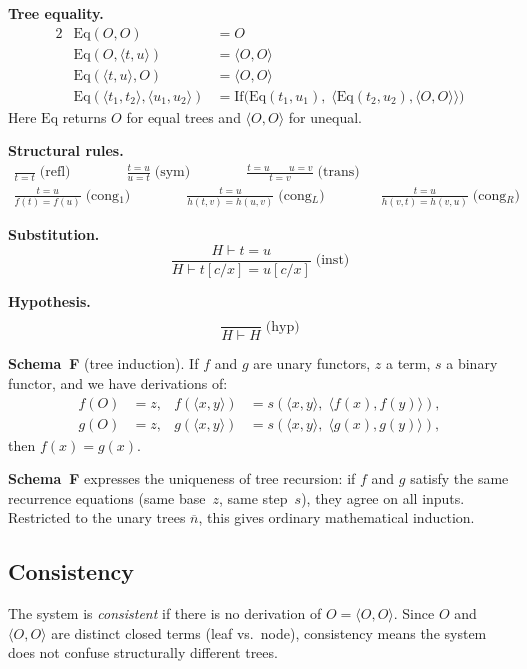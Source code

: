 \documentclass[11pt]{article}
\newcommand{\pair}[2]{\langle #1, #2 \rangle}
\newcommand{\pmark}{\pair{O}{O}}   %
\newcommand{\SchemaF}{\textbf{Schema~F}}
\newcommand{\nat}[1]{\overline{#1}}
\begin{document}
\noindent
\textbf{Tree equality.}
\begin{alignat*}{2}
  &\mathrm{Eq}(O, O) &= O \\
  &\mathrm{Eq}(O, \pair{t}{u}) &= \pmark \\
  &\mathrm{Eq}(\pair{t}{u}, O) &= \pmark \\
  &\mathrm{Eq}(\pair{t_1}{t_2}, \pair{u_1}{u_2})
    &= \mathrm{If}\bigl(\mathrm{Eq}(t_1, u_1),\;
         \pair{\mathrm{Eq}(t_2, u_2)}{\pmark}\bigr)
\end{alignat*}
Here $\mathrm{Eq}$ returns $O$ for equal trees and $\pmark$ for unequal.

\medskip\noindent
\textbf{Structural rules.}
\begin{gather*}
  \frac{\phantom{t=t}}{t = t}\;\text{(refl)}
  \qquad\qquad
  \frac{t = u}{u = t}\;\text{(sym)}
  \qquad\qquad
  \frac{t = u \qquad u = v}{t = v}\;\text{(trans)}
  \\[8pt]
  \frac{t = u}{f(t) = f(u)}\;\text{(cong$_1$)}
  \qquad\qquad
  \frac{t = u}{h(t, v) = h(u, v)}\;\text{(cong$_L$)}
  \qquad\qquad
  \frac{t = u}{h(v, t) = h(v, u)}\;\text{(cong$_R$)}
\end{gather*}

\noindent
\textbf{Substitution.}
\[
  \frac{H \vdash t = u}
       {H \vdash t[c/x] = u[c/x]}
  \;\text{(inst)}
\]

\noindent
\textbf{Hypothesis.}
\[
  \frac{\phantom{H}}{H \vdash H}
  \;\text{(hyp)}
\]

\noindent
\textbf{Schema~F} (tree induction).
If $f$ and $g$ are unary functors, $z$ a term, $s$ a binary functor,
and we have derivations of:
\begin{align*}
  f(O) &= z,  &  f(\pair{x}{y}) &= s(\pair{x}{y},\; \pair{f(x)}{f(y)}), \\
  g(O) &= z,  &  g(\pair{x}{y}) &= s(\pair{x}{y},\; \pair{g(x)}{g(y)}),
\end{align*}
then $f(x) = g(x)$.

\medskip
\SchemaF{} expresses the uniqueness of tree recursion:
if $f$ and $g$ satisfy the same recurrence equations
(same base~$z$, same step~$s$), they agree on all inputs.
Restricted to the unary trees $\nat{n}$, this gives ordinary
mathematical induction.

\subsection*{Consistency}

The system is \emph{consistent} if there is no derivation of
$O = \pmark$.  Since $O$ and $\pmark$ are distinct closed terms
(leaf vs.\ node), consistency means the system does not confuse
structurally different trees.
\end{document}

